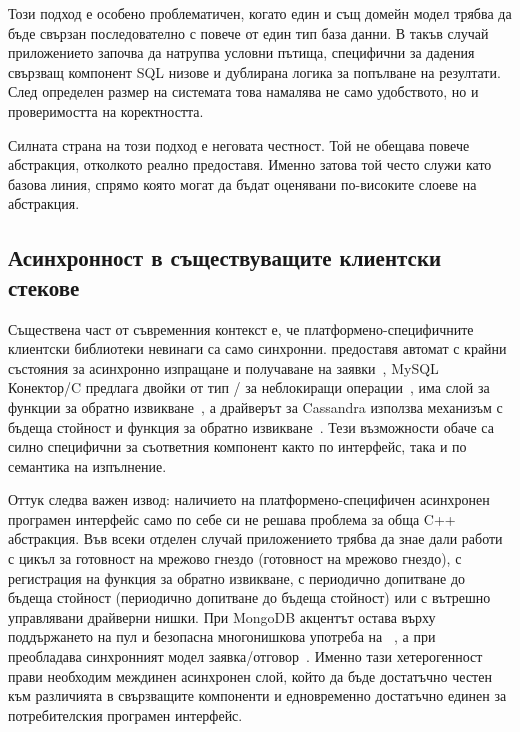 Този подход е особено проблематичен, когато един и същ домейн модел трябва да бъде свързан последователно с повече от един тип база данни. В такъв случай приложението започва да натрупва условни пътища, специфични за дадения свързващ компонент SQL низове и дублирана логика за попълване на резултати. След определен размер на системата това намалява не само удобството, но и проверимостта на коректността.

Силната страна на този подход е неговата честност. Той не обещава повече абстракция, отколкото реално предоставя. Именно затова той често служи като базова линия, спрямо която могат да бъдат оценявани по-високите слоеве на абстракция.

\subsection{Асинхронност в съществуващите клиентски стекове}

Съществена част от съвременния контекст е, че платформено-специфичните клиентски библиотеки невинаги са само синхронни.  предоставя автомат с крайни състояния за асинхронно изпращане и получаване на заявки~\cite{libpq_async}, MySQL Конектор/C предлага двойки от тип / за неблокиращи операции~\cite{mysql_capi_async},  има слой за функции за обратно извикване~\cite{hiredis}, а драйверът за Cassandra използва механизъм с бъдеща стойност и функция за обратно извикване~\cite{cassandra_futures}. Тези възможности обаче са силно специфични за съответния компонент както по интерфейс, така и по семантика на изпълнение.

Оттук следва важен извод: наличието на платформено-специфичен асинхронен програмен интерфейс само по себе си не решава проблема за обща C++ абстракция. Във всеки отделен случай приложението трябва да знае дали работи с цикъл за готовност на мрежово гнездо (готовност на мрежово гнездо), с регистрация на функция за обратно извикване, с периодично допитване до бъдеща стойност (периодично допитване до бъдеща стойност) или с вътрешно управлявани драйверни нишки. При MongoDB акцентът остава върху поддържането на пул и безопасна многонишкова употреба на ~\cite{mongoc_client_pool}, а при  преобладава синхронният модел заявка/отговор~\cite{libneo4j_client}. Именно тази хетерогенност прави необходим междинен асинхронен слой, който да бъде достатъчно честен към различията в свързващите компоненти и едновременно достатъчно единен за потребителския програмен интерфейс.

